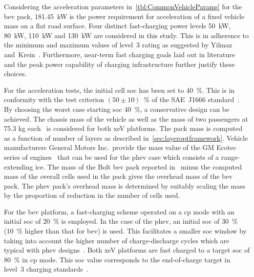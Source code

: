 Considering  the acceleration  parameters in~\cref{tbl:CommonVehicleParams}  for
the  \gls{bev}  pack,  \SI{181.45}{\kilo\watt}  is  the  power  requirement  for
acceleration  of a  fixed vehicle  mass on  a flat  road surface.  Four distinct
fast-charging  power  levels  \viz{}  \SI{50}{\kilo\watt},  \SI{80}{\kilo\watt},
\SI{110}{\kilo\watt} and \SI{130}{\kilo\watt} are considered in this study. This
is in adherence to the minimum and maximum values of level~3 rating as suggested
by  Yilmaz  and~Krein~\cite{Yilmaz2012}.  Furthermore, near-term  fast  charging
goals  laid out  in literature~\cite{Ashique2017,Srdic2016}  and the  peak power
capability of charging infrastructure further justify these choices.



For  the  acceleration  tests,  the  initial cell  \gls{soc}  has  been  set  to
\SI{40}{\percent}.  This  is  in  conformity with  the  test  criterion  $(50\pm
10)$~\%  of  the  SAE~J1666   standard~\cite{Sae2010}.  By  choosing  the  worst
case  starting  \gls{soc} \ie{}  \SI{40}{\percent},  a  conservative design  can
be  achieved.  The  chassis  mass  of  the  vehicle  as  well  as  the  mass  of
two  passengers   at  75.3  kg   each~\cite{Sae2010}  is  considered   for  both
\gls{xeV}  platforms.  The  pack  mass  is computed  as  a  function  of  number
of  layers as  described in~\cref{sec:layeroptframework}.  Vehicle manufacturers
General  Motors  Inc.\, provide  the  mass  value of  the  GM  Ecotec series  of
engines~\cite{motortrendEcotec} that can  be used for the  \gls{phev} case which
consists of  a range-extending \gls{ice}.  The mass  of the Bolt  \gls{bev} pack
reported in~\cite{ChevyBoltSpecs} minus  the computed mass of  the overall cells
used in the pack  gives the overhead mass of the  \gls{bev} pack. The \gls{phev}
pack's  overhead  mass  is  determined  by suitably  scaling  the  mass  by  the
proportion of reduction in the number of cells used.

For the \gls{bev}  platform, a fast-charging scheme operated on  a \gls{cp} mode
with an initial  \gls{soc} of \SI{20}{\percent} is employed. In  the case of the
\gls{phev}, an initial \gls{soc}  of \SI{30}{\percent} (\SI{10}{\percent} higher
than that for \gls{bev}) is used. This facilitates a smaller \gls{soc} window by
taking  into account  the higher  number  of charge-discharge  cycles which  are
typical with \gls{phev}  designs~\cite{Maksimovic2012}. Both \gls{xeV} platforms
are fast  charged to a target  \gls{soc} of \SI{80}{\percent} in  \gls{cp} mode.
This \gls{soc} value corresponds to the end-of-charge target in level~3 charging
standards~\cite{SAECharging2011}.

